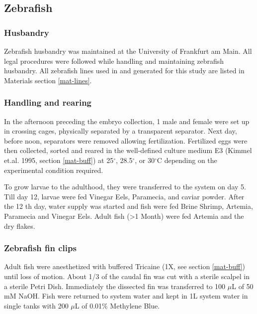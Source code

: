 \documentclass[10pt, b5paper, singlespacinge, twoside]{reedthesis} %
\theoremstyle{definition}
\theoremstyle{definition}
\theoremstyle{definition}
\theoremstyle{remark}
\begin{document}
\hypertarget{Zeb-met}{%
\subsection{Zebrafish}\label{Zeb-met}}

\hypertarget{husbandry}{%
\subsubsection{Husbandry}\label{husbandry}}

Zebraﬁsh husbandry was maintained at the University of Frankfurt am Main. All legal procedures were followed while handling and maintaining zebraﬁsh husbandry. All zebraﬁsh lines used in and generated for this study are listed in Materials section \ref{mat-lines}.

\hypertarget{handling-and-rearing}{%
\subsubsection{Handling and rearing}\label{handling-and-rearing}}

In the afternoon preceding the embryo collection, 1 male and female were set up in crossing cages, physically separated by a transparent separator. Next day, before noon, separators were removed allowing fertilization. Fertilized eggs were then collected, sorted and reared in the well-defined culture medium E3 (Kimmel et.al. 1995, section \ref{mat-buff}) at 25\(^\circ\), 28.5\(^\circ\), or 30\(^\circ\)C depending on the experimental condition required.

To grow larvae to the adulthood, they were transferred to the system on day 5. Till day 12, larvae were fed Vinegar Eels, Paramecia, and caviar powder. After the 12 th day, water supply was started and fish were fed Brine Shrimp, Artemia, Paramecia and Vinegar Eels. Adult fish (\textgreater1 Month) were fed Artemia and the dry flakes.

\hypertarget{zebrafish-fin-clips}{%
\subsubsection{Zebrafish fin clips}\label{zebrafish-fin-clips}}

Adult fish were anesthetized with buffered Tricaine (1X, see section \ref{mat-buff}) until loss of motion. About 1/3 of the caudal fin was cut with a sterile scalpel in a sterile Petri Dish. Immediately the dissected fin was transferred to 100 \(\mu\)L of 50 mM NaOH. Fish were returned to system water and kept in 1L system water in single tanks with 200 \(\mu\)L of 0.01\(\%\) Methylene Blue.
\end{document}

